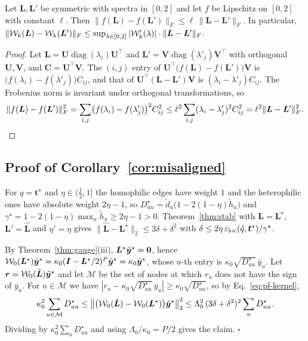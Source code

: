 \begin{lemma}\label{lem:frob}
Let $\bm L,\bm L'$ be symmetric with spectra in $[0,2]$ and let $f$ be Lipschitz on $[0,2]$ with constant $\ell$. Then $\|f(\bm L)-f(\bm L')\|_F\le\ell\,\|\bm L-\bm L'\|_F$. In particular, $\|\mathcal{W}_k(\bm L)-\mathcal{W}_k(\bm L')\|_F\le\sup_{\lambda\in[0,2]}|\mathcal W_k'(\lambda)|\cdot\|\bm L-\bm L'\|_F$.
\end{lemma}
\begin{proof}
Let $\bm L=\bm U\operatorname{diag}(\lambda_i)\bm U^{\top}$ and $\bm L'=\bm V\operatorname{diag}(\lambda'_j)\bm V^{\top}$ with orthogonal $\bm U,\bm V$, and $\bm C=\bm U^{\top}\bm V$.
The $(i,j)$ entry of $\bm U^{\top}\bigl(f(\bm L)-f(\bm L')\bigr)\bm V$ is $\bigl(f(\lambda_i)-f(\lambda'_j)\bigr)C_{ij}$, and that of $\bm U^{\top}(\bm L-\bm L')\bm V$ is $(\lambda_i-\lambda'_j)C_{ij}$.
The Frobenius norm is invariant under orthogonal transformations, so
\[
\|f(\bm L)-f(\bm L')\|_F^2=\sum_{i,j}\bigl(f(\lambda_i)-f(\lambda'_j)\bigr)^2C_{ij}^2
\le\ell^2\sum_{i,j}(\lambda_i-\lambda'_j)^2C_{ij}^2=\ell^2\|\bm L-\bm L'\|_F^2.\qedhere
\]
\end{proof}

\subsection{Proof of Corollary~\ref{cor:misaligned}}
For $q=\bm t^\star$ and $\eta\in(\tfrac12,1]$ the homophilic edges have weight $1$ and the heterophilic ones have absolute weight $2\eta-1$, so $D^\star_{uu}=\tilde d_u\bigl(1-2(1-\eta)\tilde h_u\bigr)$ and $\gamma^\star=1-2(1-\eta)\max_u\tilde h_u\ge2\eta-1>0$.
Theorem~\ref{thm:stab} with $\bm L=\bm L^\star$, $\bm L'=\hat{\bm L}$ and $\eta'=\eta$ gives $\|\hat{\bm L}-\bm L^\star\|_2\le3\delta+\delta^2$ with $\delta\le2\eta\,\varepsilon_{\mathrm{loc}}(\hat q,\bm t^\star)/\gamma^\star$.

By Theorem~\ref{thm:gauge}(iii), $\bm L^\star\tilde{\bm{y}}^\star=\bm 0$, hence $\mathcal W_0(\bm L^\star)\tilde{\bm{y}}^\star=\kappa_0(\bm I-\bm L^\star/2)^P\tilde{\bm{y}}^\star=\kappa_0\tilde{\bm{y}}^\star$, whose $u$-th entry is $\kappa_0\sqrt{D^\star_{uu}}\,\bar y_u$.
Let $\bm r=\mathcal W_0(\hat{\bm L})\tilde{\bm{y}}^\star$ and let $\mathcal M$ be the set of nodes at which $r_u$ does not have the sign of $\bar y_u$.
For $u\in\mathcal M$ we have $|r_u-\kappa_0\sqrt{D^\star_{uu}}\,\bar y_u|\ge\kappa_0\sqrt{D^\star_{uu}}$, so by Eq.~\eqref{eq:pf-kernel},
\[
\kappa_0^2\sum_{u\in\mathcal M}D^\star_{uu}\le\bigl\|\bigl(\mathcal W_0(\hat{\bm L})-\mathcal W_0(\bm L^\star)\bigr)\tilde{\bm{y}}^\star\bigr\|_2^2
\le\Lambda_0^2\,(3\delta+\delta^2)^2\sum_uD^\star_{uu}.
\]
Dividing by $\kappa_0^2\sum_uD^\star_{uu}$ and using $\Lambda_0/\kappa_0=P/2$ gives the claim.
\hfill$\square$

